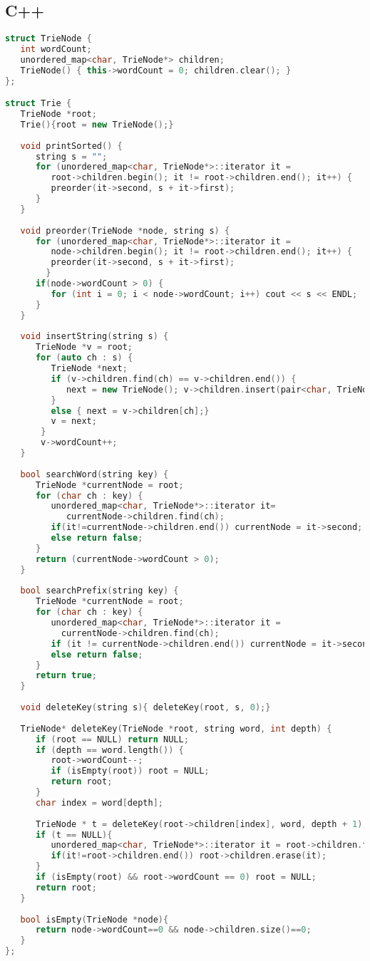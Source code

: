 \subsection{C++}
\begin{lstlisting}[language=C++]
struct TrieNode {
   int wordCount;
   unordered_map<char, TrieNode*> children;
   TrieNode() { this->wordCount = 0; children.clear(); }
};

struct Trie {
   TrieNode *root;
   Trie(){root = new TrieNode();}
   
   void printSorted() {
      string s = "";
      for (unordered_map<char, TrieNode*>::iterator it =
         root->children.begin(); it != root->children.end(); it++) {
         preorder(it->second, s + it->first);
      }
   }
	
   void preorder(TrieNode *node, string s) {
      for (unordered_map<char, TrieNode*>::iterator it =
         node->children.begin(); it != root->children.end(); it++) {
         preorder(it->second, s + it->first);
		}
      if(node->wordCount > 0) {
         for (int i = 0; i < node->wordCount; i++) cout << s << ENDL;
      }
   }
	
   void insertString(string s) {
      TrieNode *v = root;
      for (auto ch : s) {
         TrieNode *next;
         if (v->children.find(ch) == v->children.end()) {
            next = new TrieNode(); v->children.insert(pair<char, TrieNode*>(ch, next));
         }
         else { next = v->children[ch];}
         v = next;
       }
       v->wordCount++;
   }
	
   bool searchWord(string key) {
      TrieNode *currentNode = root;
      for (char ch : key) {
         unordered_map<char, TrieNode*>::iterator it=
         	currentNode->children.find(ch);
         if(it!=currentNode->children.end()) currentNode = it->second;
         else return false;
      }
      return (currentNode->wordCount > 0);
   }
	
   bool searchPrefix(string key) {
      TrieNode *currentNode = root;
      for (char ch : key) {
         unordered_map<char, TrieNode*>::iterator it =
           currentNode->children.find(ch);
         if (it != currentNode->children.end()) currentNode = it->second;
         else return false;
      }
      return true;
   }
	
   void deleteKey(string s){ deleteKey(root, s, 0);}
	
   TrieNode* deleteKey(TrieNode *root, string word, int depth) {
      if (root == NULL) return NULL;
      if (depth == word.length()) {
         root->wordCount--;
         if (isEmpty(root)) root = NULL;
         return root;
      }
      char index = word[depth];
		
      TrieNode * t = deleteKey(root->children[index], word, depth + 1);
      if (t == NULL){
         unordered_map<char, TrieNode*>::iterator it = root->children.find(index);
         if(it!=root->children.end()) root->children.erase(it);
      }
      if (isEmpty(root) && root->wordCount == 0) root = NULL;
      return root;
   }
	
   bool isEmpty(TrieNode *node){
      return node->wordCount==0 && node->children.size()==0;
   }
};
\end{lstlisting}	

